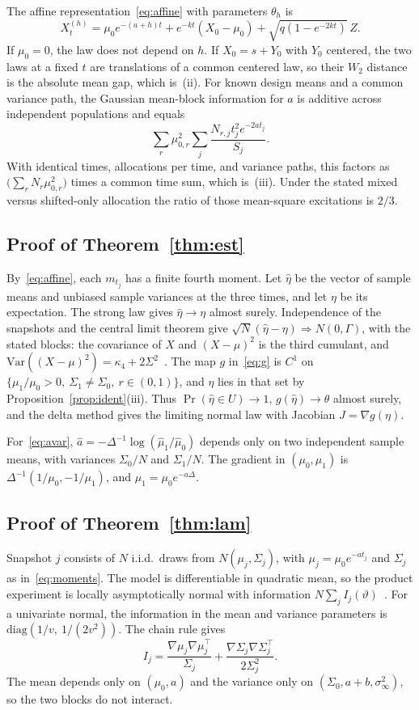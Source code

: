 \documentclass[anon,11pt]{alt2027}
\providecommand{\qed}{\hfill\BlackBox}
\newcommand{\Var}{\mathrm{Var}}
\begin{document}
The affine representation~\eqref{eq:affine} with parameters $\theta_h$ is
\[
X_t^{(h)}
=
\mu_0 e^{-(a+h)t}
+
e^{-kt}(X_0-\mu_0)
+
\sqrt{q(1-e^{-2kt})}\,Z.
\]
If $\mu_0=0$, the law does not depend on $h$. If $X_0=s+Y_0$ with $Y_0$
centered, the two laws at a fixed $t$ are translations of a common centered
law, so their $W_2$ distance is the absolute mean gap, which is~(ii). For
known design means and a common variance path, the Gaussian mean-block
information for $a$ is additive across independent populations and equals
\[
\sum_r\mu_{0,r}^2\sum_j\frac{N_{r,j}t_j^2 e^{-2at_j}}{S_j}.
\]
With identical times, allocations per time, and variance paths, this factors
as $\bigl(\sum_r N_r\mu_{0,r}^2\bigr)$ times a common time sum, which is~(iii).
Under the stated mixed versus shifted-only allocation the ratio of those
mean-square excitations is $2/3$.\qed

\subsection{Proof of Theorem~\ref{thm:est}}

By~\eqref{eq:affine}, each $m_{t_j}$ has a finite fourth moment. Let $\hat\eta$
be the vector of sample means and unbiased sample variances at the three times,
and let $\eta$ be its expectation. The strong law gives $\hat\eta\to\eta$ almost
surely. Independence of the snapshots and the central limit theorem give
$\sqrt N(\hat\eta-\eta)\Rightarrow N(0,\Gamma)$, with the stated blocks: the
covariance of $X$ and $(X-\mu)^2$ is the third cumulant, and
$\Var((X-\mu)^2)=\kappa_4+2\Sigma^2$~\cite[Ch.~3]{vanderVaart98}.
The map $g$ in~\eqref{eq:g} is $C^1$ on
$\{\mu_1/\mu_0>0,\ \Sigma_1\neq\Sigma_0,\ r\in(0,1)\}$, and $\eta$ lies in that
set by Proposition~\ref{prop:ident}(iii). Thus
$\Pr(\hat\eta\in U)\to 1$, $g(\hat\eta)\to\theta$ almost surely, and the delta
method gives the limiting normal law with Jacobian $J=\nabla g(\eta)$.

For~\eqref{eq:avar}, $\hat a=-\Delta^{-1}\log(\hat\mu_1/\hat\mu_0)$ depends only
on two independent sample means, with variances $\Sigma_0/N$ and $\Sigma_1/N$.
The gradient in $(\mu_0,\mu_1)$ is $\Delta^{-1}(1/\mu_0,-1/\mu_1)$, and
$\mu_1=\mu_0 e^{-a\Delta}$.\qed

\subsection{Proof of Theorem~\ref{thm:lam}}

Snapshot $j$ consists of $N$ i.i.d.\ draws from
$N(\mu_j,\Sigma_j)$, with $\mu_j=\mu_0 e^{-at_j}$ and $\Sigma_j$ as
in~\eqref{eq:moments}. The model is differentiable in quadratic mean, so the
product experiment is locally asymptotically normal with information
$N\sum_j I_j(\vartheta)$~\cite[Ch.~7]{vanderVaart98}. For a univariate normal,
the information in the mean and variance parameters is
$\mathrm{diag}(1/v,\ 1/(2v^2))$. The chain rule gives
\[
I_j
=
\frac{\nabla\mu_j\nabla\mu_j^\top}{\Sigma_j}
+
\frac{\nabla\Sigma_j\nabla\Sigma_j^\top}{2\Sigma_j^2}.
\]
The mean depends only on $(\mu_0,a)$ and the variance only on
$(\Sigma_0,a+b,\sigma_\infty^2)$, so the two blocks do not interact.
\end{document}
